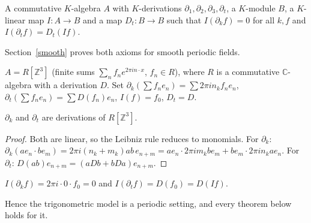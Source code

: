 \documentclass[11pt]{article}
\begin{document}
\begin{definition}
A commutative $K$-algebra $A$ with $K$-derivations $\partial_1,\partial_2,\partial_3,\partial_t$, a
$K$-module $B$, a $K$-linear map $I:A\to B$ and a map $D_t:B\to B$ such that
$I(\partial_k f)=0$ for all $k,f$ and $I(\partial_t f)=D_t(If)$.
\end{definition}
Section~\ref{smooth} proves both axioms for smooth periodic fields.

\begin{definition}
$A=R[\mathbb{Z}^3]$ (finite sums $\sum_n f_n e^{2\pi i n\cdot x}$, $f_n\in R$), where $R$ is a
commutative $\mathbb{C}$-algebra with a derivation $D$. Set
$\partial_k(\sum f_n e_n)=\sum 2\pi i n_k f_n e_n$, $\partial_t(\sum f_n e_n)=\sum D(f_n)e_n$,
$I(f)=f_0$, $D_t=D$.
\end{definition}

\begin{lemma}
$\partial_k$ and $\partial_t$ are derivations of $R[\mathbb{Z}^3]$.
\end{lemma}
\begin{proof}
Both are linear, so the Leibniz rule reduces to monomials. For $\partial_k$:
$\partial_k(a e_n\cdot b e_m)=2\pi i(n_k+m_k)ab\,e_{n+m}
=a e_n\cdot 2\pi i m_k b e_m+b e_m\cdot 2\pi i n_k a e_n$. For $\partial_t$:
$D(ab)e_{n+m}=(aD b+bDa)e_{n+m}$.
\end{proof}
\begin{lemma}
$I(\partial_k f)=2\pi i\cdot 0\cdot f_0=0$ and $I(\partial_t f)=D(f_0)=D(If)$.
\end{lemma}
Hence the trigonometric model is a periodic setting, and every theorem below holds for it.
\end{document}
